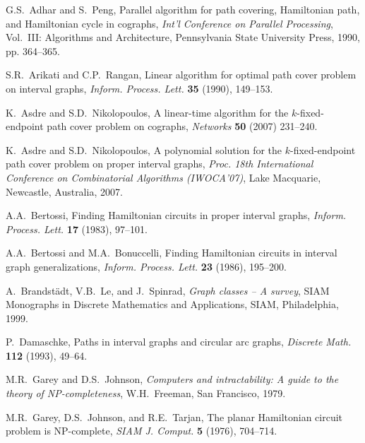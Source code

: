 \documentclass[10pt]{article}
\begin{document}
 \frenchspacing \vskip 0.4in

\begin{thebibliography}{99}
 G.S.~Adhar and S.~Peng, Parallel algorithm for path covering,
Hamiltonian path, and Hamiltonian cycle in cographs, {\it Int'l
Conference on Parallel Processing}, Vol.~III: Algorithms and
Architecture, Pennsylvania State University Press, 1990, pp.
364--365.

 S.R.~Arikati and C.P.~Rangan, Linear algorithm for optimal path
cover problem on interval graphs, {\it Inform. Process. Lett.}
{\bf 35} (1990), 149--153.

 K.~Asdre and S.D.~Nikolopoulos, A linear-time algorithm for the
$k$-fixed-endpoint path cover problem on cographs, {\it Networks}
{\bf 50} (2007) 231--240.

 K.~Asdre and S.D.~Nikolopoulos, A polynomial solution for the
$k$-fixed-endpoint path cover problem on proper interval graphs,
{\it Proc. 18th International Conference on Combinatorial
Algorithms (IWOCA'07)}, Lake Macquarie, Newcastle, Australia,
2007.



 A.A.~Bertossi, Finding Hamiltonian circuits in proper interval
graphs, {\it Inform. Process. Lett.} {\bf 17} (1983), 97--101.

 A.A.~Bertossi and M.A.~Bonuccelli, Finding Hamiltonian circuits in
interval graph generalizations, {\it Inform. Process. Lett.} {\bf
23} (1986), 195--200.

 A.~Brandst\"{a}dt, V.B.~Le, and J.~Spinrad, {\it Graph classes --
A survey}, SIAM Monographs in Discrete Mathematics and
Applications, SIAM, Philadelphia, 1999.









 P.~Damaschke, Paths in interval graphs and circular arc graphs,
{\it Discrete Math.} {\bf 112} (1993), 49--64.



 M.R.~Garey and D.S.~Johnson, {\it Computers and intractability: A
guide to the theory of NP-completeness}, W.H.~Freeman, San
Francisco, 1979.

 M.R.~Garey, D.S.~Johnson, and R.E.~Tarjan, The planar Hamiltonian
circuit problem is NP-complete, {\it SIAM J. Comput.} {\bf 5}
(1976), 704--714.




\end{thebibliography}
\end{document}
